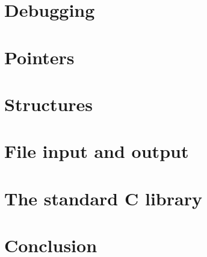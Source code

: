 \documentclass[openany]{book}
\begin{document}
\chapter{Debugging}


\chapter{Pointers}


\chapter{Structures}


\chapter{File input and output}


\chapter{The standard C library}


\chapter{Conclusion}


\end{document}
